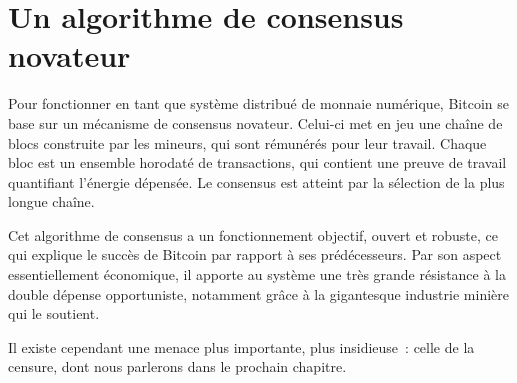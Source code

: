 \section*{Un algorithme de consensus novateur}

Pour fonctionner en tant que système distribué de monnaie numérique, Bitcoin se base sur un mécanisme de consensus novateur. Celui-ci met en jeu une chaîne de blocs construite par les mineurs, qui sont rémunérés pour leur travail. Chaque bloc est un ensemble horodaté de transactions, qui contient une preuve de travail quantifiant l'énergie dépensée. Le consensus est atteint par la sélection de la plus longue chaîne.

Cet algorithme de consensus a un fonctionnement objectif, ouvert et robuste, ce qui explique le succès de Bitcoin par rapport à ses prédécesseurs. Par son aspect essentiellement économique, il apporte au système une très grande résistance à la double dépense opportuniste, notamment grâce à la gigantesque industrie minière qui le soutient.

Il existe cependant une menace plus importante, plus insidieuse~: celle de la censure, dont nous parlerons dans le prochain chapitre.